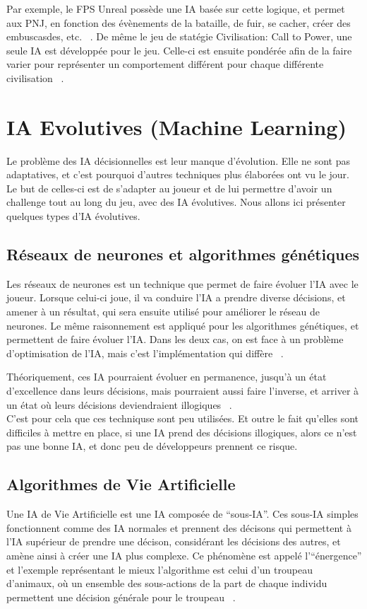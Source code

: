 \documentclass[asi]{picINSAIA}
\begin{document}
Par exemple, le FPS Unreal possède une IA basée sur cette logique, et permet aux PNJ, en fonction des évènements de la bataille, de fuir, se cacher, créer des embuscasdes, etc. ~\cite{CompGamesWithIntel}.
De même le jeu de statégie Civilisation: Call to Power, une seule IA est développée pour le jeu. Celle-ci est ensuite pondérée afin de la faire varier pour représenter un comportement différent pour chaque différente civilisation ~\cite{CompGamesWithIntel}. 


\chapter{IA Evolutives (Machine Learning)}
Le problème des IA décisionnelles est leur manque d'évolution. Elle ne sont pas adaptatives, et c'est pourquoi d'autres techniques plus élaborées ont vu le jour. Le but de celles-ci est de s'adapter au joueur et de lui permettre d'avoir un challenge tout au long du jeu, avec des IA évolutives. Nous allons ici présenter quelques types d'IA évolutives.

\section{Réseaux de neurones et algorithmes génétiques}
Les réseaux de neurones est un technique que permet de faire évoluer l'IA avec le joueur. Lorsque celui-ci joue, il va conduire l'IA a prendre diverse décisions, et amener à un résultat, qui sera ensuite utilisé pour améliorer le réseau de neurones. Le même raisonnement est appliqué pour les algorithmes génétiques, et permettent de faire évoluer l'IA. Dans les deux cas, on est face à un problème d'optimisation de l'IA, mais c'est l'implémentation qui diffère ~\cite{alvarez2013machine}.

Théoriquement, ces IA pourraient évoluer en permanence, jusqu'à un état d'excellence dans leurs décisions, mais pourraient aussi faire l'inverse, et arriver à un état où leurs décisions deviendraient illogiques ~\cite{CompGamesWithIntel}.\\
C'est pour cela que ces techniquse sont peu utilisées. Et outre le fait qu'elles sont difficiles à mettre en place, si une IA prend des décisions illogiques, alors ce n'est pas une bonne IA, et donc peu de développeurs prennent ce risque.\\

\section{Algorithmes de Vie Artificielle}
Une IA de Vie Artificielle est une IA composée de ``sous-IA''. Ces sous-IA simples fonctionnent comme des IA normales et prennent des décisons qui permettent à l'IA supérieur de prendre une décison, considérant les décisions des autres, et amène ainsi à créer une IA plus complexe.
Ce phénomène est appelé l'``énergence'' et l'exemple représentant le mieux l'algorithme est celui d'un troupeau d'animaux, où un ensemble des sous-actions de la part de chaque individu permettent une décision générale pour le troupeau ~\cite{CompGamesWithIntel}.
\end{document}
